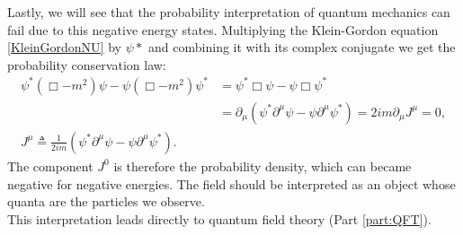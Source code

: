 Lastly, we will see that the probability interpretation of quantum mechanics can fail due to this negative energy states. Multiplying the Klein-Gordon equation \eqref{KleinGordonNU} by $\psi*$ and combining it with its complex conjugate we get the probability conservation law:
\begin{align*}
    \psi^*(\Box-m^2)\psi-\psi(\Box-m^2)\psi^*&=\psi^*\Box\psi-\psi\Box\psi^*\\&=\partial_\mu(\psi^*\partial^\mu\psi-\psi\partial^\mu\psi^*)=2im\partial_\mu J^\mu=0,\\
    J^\mu\triangleq \frac{1}{2im}(\psi^*\partial^\mu\psi-\psi\partial^\mu\psi^*).
\end{align*} 
The component $J^0$ is therefore the probability density, which can became negative for negative energies. The field should be interpreted as an object whose quanta are the particles we observe.\\ This interpretation leads directly to quantum field theory (Part \ref{part:QFT}).
